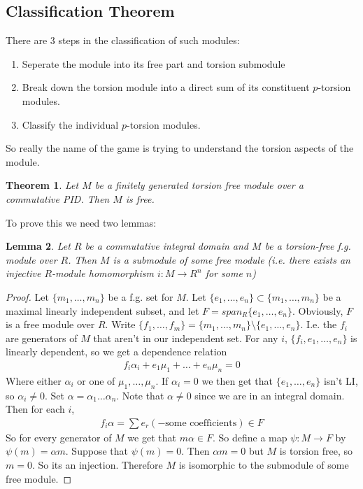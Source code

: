 \documentclass[12pt]{book}
\newtheorem{theorem}{Theorem}[chapter]
\newtheorem{lemma}[theorem]{Lemma}
\theoremstyle{definition}
\begin{document}
\subsection{Classification Theorem}
There are 3 steps in the classification of such modules: 
\begin{enumerate}
    \item Seperate the module into its free part and torsion submodule
    \item Break down the torsion module into a direct sum of its constituent $p$-torsion modules. 
    \item Classify the individual $p$-torsion modules. 
\end{enumerate}
So really the name of the game is trying to understand the torsion aspects of the module. 
\begin{theorem}
    \label{f.g. free module}
    Let $M$ be a finitely generated torsion free module over a commutative PID. Then $M$ is free.  
\end{theorem}

To prove this we need two lemmas: 

\begin{lemma}
    Let $R$ be a commutative integral domain and $M$ be a torsion-free f.g. module over $R$. Then $M$ is a submodule of some free module (i.e. there exists an injective $R$-module homomorphism $i : M \to R^n$ for some $n$)
\end{lemma}
\begin{proof}
    Let $\{m_1, \dots, m_n\}$ be a f.g. set for $M$. Let $\{e_1, \dots, e_n\} \subset \{m_1, \dots, m_n\}$ be a maximal linearly independent subset, and let $F = span_R\{e_1, \dots, e_n\}$. Obviously, $F$ is a free module over $R$. Write $\{f_1, \dots, f_m\} = \{m_1, \dots, m_n\} \setminus \{e_1, \dots, e_n\}$. I.e. the $f_i$ are generators of $M$ that aren't in our independent set. For any $i$, $\{f_i, e_1, \dots, e_n\}$ is linearly dependent, so we get a dependence relation
    \begin{align*}
        f_i \alpha_i + e_1 \mu_1 + \dots + e_n \mu_n = 0
    \end{align*}
    Where either $\alpha_i$ or one of $\mu_1, \dots, \mu_n$. If $\alpha_i = 0$ we then get that $\{e_1, \dots, e_n\}$ isn't LI, so $\alpha_i \neq 0$. Set $\alpha = \alpha_1 \dots \alpha_n$. Note that $\alpha \neq 0$ since we are in an integral domain. Then for each $i$,
    \begin{align*}
        f_i \alpha = \sum e_r (- \text{some coefficients}) \in F
    \end{align*}
    So for every generator of $M$ we get that $m\alpha \in F$. So define a map $\psi: M \to F$ by $\psi(m) = \alpha m$. Suppose that $\psi(m) = 0$. Then $\alpha m = 0$ but $M$ is torsion free, so $m = 0$. So its an injection. Therefore $M$ is isomorphic to the submodule of some free module. 
\end{proof}
\end{document}
